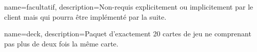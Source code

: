 {
    name={facultatif},
    description={Non-requis explicitement ou implicitement par le client mais qui pourra être implémenté par la suite.}
}

{
    name={deck},
    description={Paquet d'exactement 20 cartes de jeu ne comprenant pas plus de deux fois la même carte.}
}
